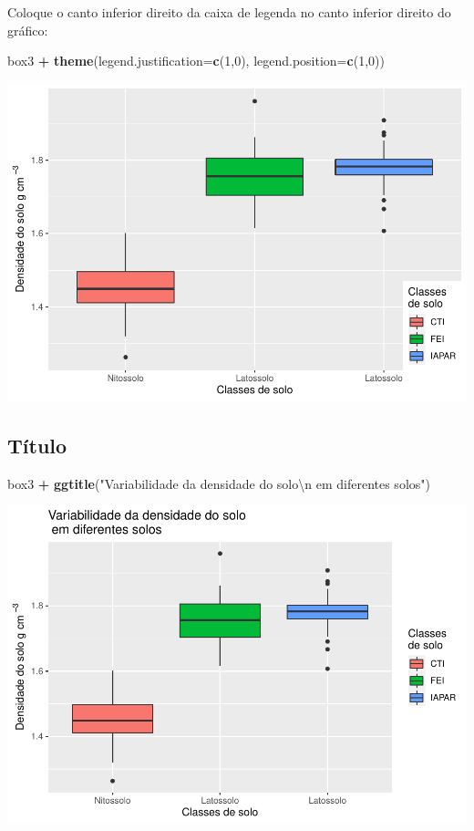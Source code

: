 \documentclass[
]{book}
\newenvironment{Shaded}{\begin{snugshade}}{\end{snugshade}}
\newcommand{\CharTok}[1]{\textcolor[rgb]{0.31,0.60,0.02}{#1}}
\newcommand{\DataTypeTok}[1]{\textcolor[rgb]{0.13,0.29,0.53}{#1}}
\newcommand{\DecValTok}[1]{\textcolor[rgb]{0.00,0.00,0.81}{#1}}
\newcommand{\KeywordTok}[1]{\textcolor[rgb]{0.13,0.29,0.53}{\textbf{#1}}}
\newcommand{\NormalTok}[1]{#1}
\newcommand{\OperatorTok}[1]{\textcolor[rgb]{0.81,0.36,0.00}{\textbf{#1}}}
\newcommand{\StringTok}[1]{\textcolor[rgb]{0.31,0.60,0.02}{#1}}
\begin{document}
Coloque o canto inferior direito da caixa de legenda no canto inferior direito do gráfico:

\begin{Shaded}
\begin{Highlighting}[]
\NormalTok{box3 }\OperatorTok{+}\StringTok{ }\KeywordTok{theme}\NormalTok{(}\DataTypeTok{legend.justification=}\KeywordTok{c}\NormalTok{(}\DecValTok{1}\NormalTok{,}\DecValTok{0}\NormalTok{), }\DataTypeTok{legend.position=}\KeywordTok{c}\NormalTok{(}\DecValTok{1}\NormalTok{,}\DecValTok{0}\NormalTok{))}
\end{Highlighting}
\end{Shaded}

\includegraphics{TudodoR_files/figure-latex/unnamed-chunk-218-1.pdf}

\hypertarget{tuxedtulo}{%
\subsection{Título}\label{tuxedtulo}}

\begin{Shaded}
\begin{Highlighting}[]
\NormalTok{box3 }\OperatorTok{+}\StringTok{ }\KeywordTok{ggtitle}\NormalTok{(}\StringTok{"Variabilidade da densidade do solo}\CharTok{\textbackslash{}n}\StringTok{ em diferentes solos"}\NormalTok{)}
\end{Highlighting}
\end{Shaded}

\includegraphics{TudodoR_files/figure-latex/unnamed-chunk-219-1.pdf}
\end{document}
